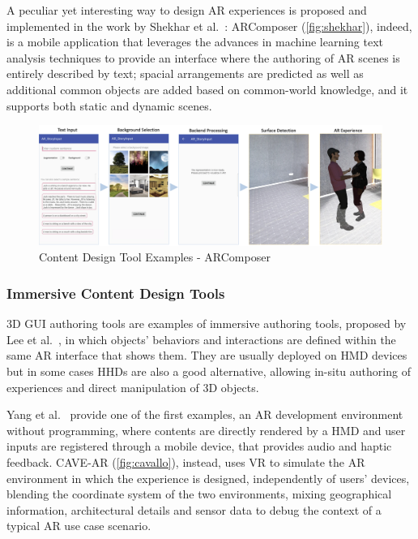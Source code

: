 A peculiar yet interesting way to design AR experiences is proposed and implemented in the work by Shekhar et al.~\cite{shekhar_arcomposer_2019}: ARComposer (\autoref{fig:shekhar}), indeed, is a mobile application that leverages the advances in machine learning text analysis techniques to provide an interface where the authoring of AR scenes is entirely described by text; spacial arrangements are predicted as well as additional common objects are added based on common-world knowledge, and it supports both static and dynamic scenes.

\begin{figure}[h]
    \centering
    \includegraphics[width=\textwidth]{Figures/Background/tools/Shekhar.png}
    \caption{Content Design Tool Examples - ARComposer}
    \label{fig:shekhar}
\end{figure}

\subsubsection{Immersive Content Design Tools}
\label{subsec:related-immersice-hcdf}
3D GUI authoring tools are examples of immersive authoring tools, proposed by Lee et al.~\cite{lee2005immersive}, in which objects' behaviors and interactions are defined within the same AR interface that shows them. They are usually deployed on \gls{HMD} devices but in some cases \glspl{HHD} are also a good alternative, allowing in-situ authoring of experiences and direct manipulation of 3D objects.

Yang et al.~\cite{yang_interactive_2016} provide one of the first examples, an AR development environment without programming, where contents are directly rendered by a \gls{HMD} and user inputs are registered through a mobile device, that provides audio and haptic feedback. CAVE-AR \cite{cavallo_cave-ar_2019} (\autoref{fig:cavallo}), instead, uses VR to simulate the AR environment in which the experience is designed, independently of users' devices, blending the coordinate system of the two environments, mixing geographical information, architectural details and sensor data to debug the context of a typical AR use case scenario.

